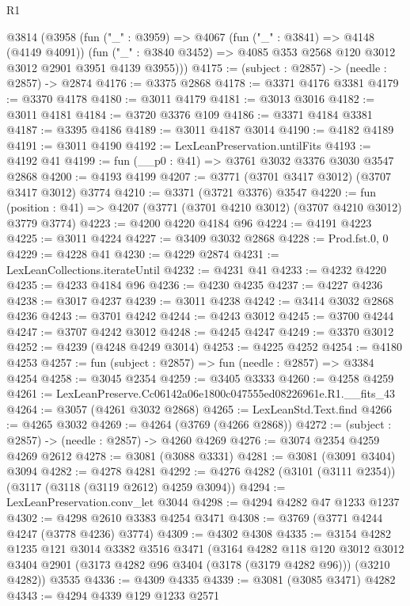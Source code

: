 \begin{lexlean}{R1}
\begin{coremodule}
  @3814
    (@3958
      (fun ("_" : @3959) =>
      @4067
        (fun ("_" : @3841) => @4148 (@4149 @4091))
        (fun ("_" : @3840 @3452) => @4085 @353 @2568 @120 @3012 @3012 @2901 @3951 @4139 @3955)))
@4175 := (subject : @2857) -> (needle : @2857) -> @2874
@4176 := @3375 @2868
@4178 := @3371 @4176 @3381
@4179 := @3370 @4178
@4180 := @3011 @4179
@4181 := @3013 @3016
@4182 := @3011 @4181
@4184 := @3720 @3376 @109
@4186 := @3371 @4184 @3381
@4187 := @3395 @4186
@4189 := @3011 @4187 @3014
@4190 := @4182 @4189
@4191 := @3011 @4190
@4192 := LexLeanPreservation.untilFits
@4193 := @4192 @41
@4199 := fun (__p0 : @41) => @3761 @3032 @3376 @3030 @3547 @2868
@4200 := @4193 @4199
@4207 := @3771 (@3701 @3417 @3012) (@3707 @3417 @3012) @3774
@4210 := @3371 (@3721 @3376) @3547
@4220 := fun (position : @41) => @4207 (@3771 (@3701 @4210 @3012) (@3707 @4210 @3012) @3779 @3774)
@4223 := @4200 @4220 @4184 @96
@4224 := @4191 @4223
@4225 := @3011 @4224
@4227 := @3409 @3032 @2868
@4228 := Prod.fst.{0, 0}
@4229 := @4228 @41
@4230 := @4229 @2874
@4231 := LexLeanCollections.iterateUntil
@4232 := @4231 @41
@4233 := @4232 @4220
@4235 := @4233 @4184 @96
@4236 := @4230 @4235
@4237 := @4227 @4236
@4238 := @3017 @4237
@4239 := @3011 @4238
@4242 := @3414 @3032 @2868 @4236
@4243 := @3701 @4242
@4244 := @4243 @3012
@4245 := @3700 @4244
@4247 := @3707 @4242 @3012
@4248 := @4245 @4247
@4249 := @3370 @3012
@4252 := @4239 (@4248 @4249 @3014)
@4253 := @4225 @4252
@4254 := @4180 @4253
@4257 := fun (subject : @2857) => fun (needle : @2857) => @3384 @4254
@4258 := @3045 @2354
@4259 := @3405 @3333
@4260 := @4258 @4259
@4261 := LexLeanPreserve.Cc06142a06e1800c047555ed08226961e.R1.__fits_43
@4264 := @3057 (@4261 @3032 @2868)
@4265 := LexLeanStd.Text.find
@4266 := @4265 @3032
@4269 := @4264 (@3769 (@4266 @2868))
@4272 := (subject : @2857) -> (needle : @2857) -> @4260 @4269
@4276 := @3074 @2354 @4259 @4269 @2612
@4278 := @3081 (@3088 @3331)
@4281 := @3081 (@3091 @3404) @3094
@4282 := @4278 @4281
@4292 := @4276 @4282 (@3101 (@3111 @2354)) (@3117 (@3118 (@3119 @2612) @4259 @3094))
@4294 := LexLeanPreservation.conv_let @3044
@4298 := @4294 @4282 @47 @1233 @1237
@4302 := @4298 @2610 @3383 @4254 @3471
@4308 := @3769 (@3771 @4244 @4247 (@3778 @4236) @3774)
@4309 := @4302 @4308
@4335 := @3154
    @4282
    @1235
    @121
    @3014
    @3382
    @3516
    @3471
    (@3164
      @4282
      @118
      @120
      @3012
      @3012
      @3404
      @2901
      (@3173 @4282 @96 @3404 (@3178 (@3179 @4282 @96)))
      (@3210 @4282))
    @3535
@4336 := @4309 @4335
@4339 := @3081 (@3085 @3471) @4282
@4343 := @4294 @4339 @129 @1233 @2571

\end{coremodule}
\end{lexlean}

